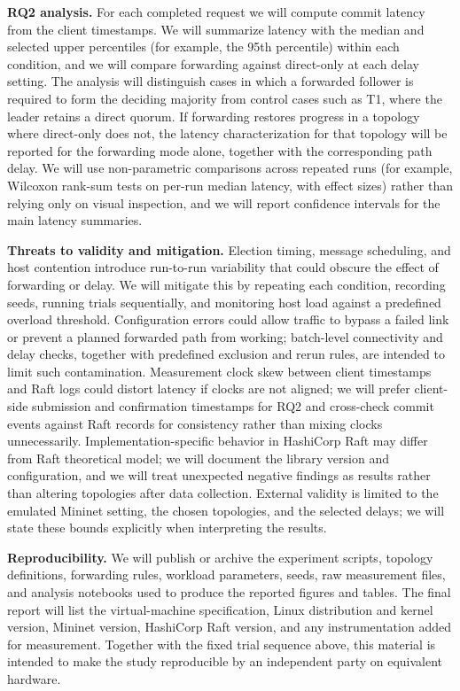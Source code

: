 \documentclass[11pt,a4paper]{article}
\begin{document}
\textbf{RQ2 analysis.}
For each completed request we will compute commit latency from the client timestamps.
We will summarize latency with the median and selected upper percentiles (for example, the 95th percentile) within each condition, and we will compare forwarding against direct-only at each delay setting.
The analysis will distinguish cases in which a forwarded follower is required to form the deciding majority from control cases such as T1, where the leader retains a direct quorum.
If forwarding restores progress in a topology where direct-only does not, the latency characterization for that topology will be reported for the forwarding mode alone, together with the corresponding path delay.
We will use non-parametric comparisons across repeated runs (for example, Wilcoxon rank-sum tests on per-run median latency, with effect sizes) rather than relying only on visual inspection, and we will report confidence intervals for the main latency summaries.

\textbf{Threats to validity and mitigation.}
Election timing, message scheduling, and host contention introduce run-to-run variability that could obscure the effect of forwarding or delay.
We will mitigate this by repeating each condition, recording seeds, running trials sequentially, and monitoring host load against a predefined overload threshold.
Configuration errors could allow traffic to bypass a failed link or prevent a planned forwarded path from working; batch-level connectivity and delay checks, together with predefined exclusion and rerun rules, are intended to limit such contamination.
Measurement clock skew between client timestamps and Raft logs could distort latency if clocks are not aligned; we will prefer client-side submission and confirmation timestamps for RQ2 and cross-check commit events against Raft records for consistency rather than mixing clocks unnecessarily.
Implementation-specific behavior in HashiCorp Raft may differ from Raft theoretical model; we will document the library version and configuration, and we will treat unexpected negative findings as results rather than altering topologies after data collection.
External validity is limited to the emulated Mininet setting, the chosen topologies, and the selected delays; we will state these bounds explicitly when interpreting the results.

\textbf{Reproducibility.}
We will publish or archive the experiment scripts, topology definitions, forwarding rules, workload parameters, seeds, raw measurement files, and analysis notebooks used to produce the reported figures and tables.
The final report will list the virtual-machine specification, Linux distribution and kernel version, Mininet version, HashiCorp Raft version, and any instrumentation added for measurement.
Together with the fixed trial sequence above, this material is intended to make the study reproducible by an independent party on equivalent hardware.
\end{document}
